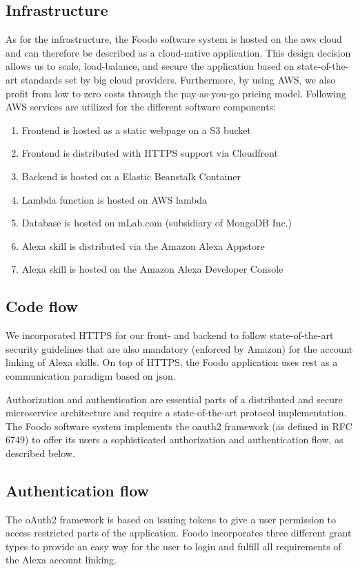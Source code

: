 \subsection*{Infrastructure}
As for the infrastructure, the Foodo software system is hosted on the \gls{aws} cloud and can therefore be described as a cloud-native application. This design decision allows us to scale, load-balance, and secure the application based on state-of-the-art standards set by big cloud providers. Furthermore, by using AWS, we also profit from low to zero costs through the pay-as-you-go pricing model. Following AWS services are utilized for the different software components:

\begin{enumerate}
	\itemsep-0.5em 
	\item Frontend is hosted as a static webpage on a S3 bucket
	\item Frontend is distributed with HTTPS support via Cloudfront
	\item Backend is hosted on a Elastic Beanstalk Container
	\item Lambda function is hosted on AWS lambda
	\item Database is hosted on mLab.com (subsidiary of MongoDB Inc.)
	\item Alexa skill is distributed via the Amazon Alexa Appstore 
	\item Alexa skill is hosted on the Amazon Alexa Developer Console
\end{enumerate}

\subsection*{Code flow}
We incorporated HTTPS for our front- and backend to follow state-of-the-art security guidelines that are also mandatory (enforced by Amazon) for the account linking of Alexa skills. On top of HTTPS, the Foodo application uses \gls{rest} as a communication paradigm based on \gls{json}.

Authorization and authentication are essential parts of a distributed and secure microservice architecture and require a state-of-the-art protocol implementation. The Foodo software system implements the \gls{oauth2} framework (as defined in RFC 6749) to offer its users a sophisticated authorization and authentication flow, as described below.  

\subsection*{Authentication flow}
The oAuth2 framework is based on issuing tokens to give a user permission to access restricted parts of the application. Foodo incorporates three different grant types to provide an easy way for the user to login and fulfill all requirements of the Alexa account linking. 

